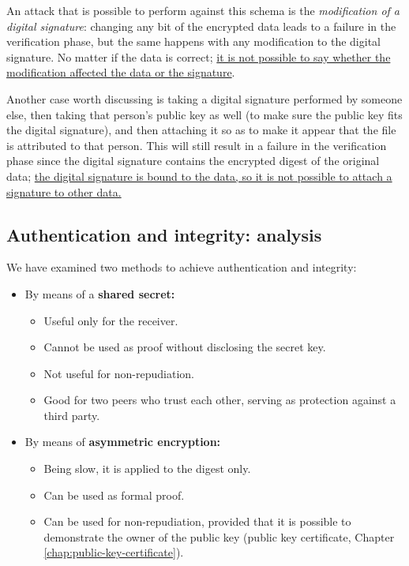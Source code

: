An attack that is possible to perform against this schema is the \textit{modification of a digital signature}: changing any bit of the encrypted data leads to a failure in the verification phase, but the same happens with any modification to the digital signature. No matter if the data is correct; \underline{it is not possible to say whether the modification affected the data or the signature}.

Another case worth discussing is taking a digital signature performed by someone else, then taking that person's public key as well (to make sure the public key fits the digital signature), and then attaching it so as to make it appear that the file is attributed to that person. This will still result in a failure in the verification phase since the digital signature contains the encrypted digest of the original data; \ul{the digital signature is bound to the data, so it is not possible to attach a signature to other data.}


\subsection{Authentication and integrity: analysis}
We have examined two methods to achieve authentication and integrity:

\begin{itemize}
    \item By means of a \textbf{shared secret:}
    \begin{itemize}
        \item Useful only for the receiver.
        \item Cannot be used as proof without disclosing the secret key.
        \item Not useful for non-repudiation.
        \item Good for two peers who trust each other, serving as protection against a third party.
    \end{itemize}

    \item By means of \textbf{asymmetric encryption:}
    \begin{itemize}
        \item Being slow, it is applied to the digest only.
        \item Can be used as formal proof.
        \item Can be used for non-repudiation, provided that it is possible to demonstrate the owner of the public key (public key certificate, Chapter \ref*{chap:public-key-certificate}).
    \end{itemize}
\end{itemize}


